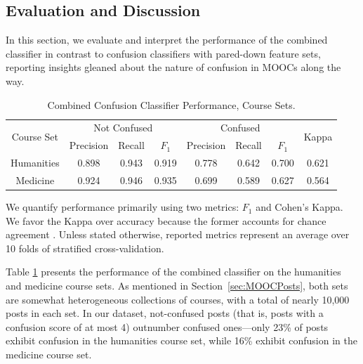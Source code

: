 \documentclass{edm_template}
\begin{document}
\subsection{Evaluation and Discussion}
In this section, we evaluate and interpret the performance of the combined classifier in contrast to confusion classifiers with pared-down feature sets, reporting insights gleaned about the nature of confusion in MOOCs along the way. 

\begin{table}[htp!]
    \centering
    \begin{tabular}{|c|c c c|c c c|c|}
    \hline
    \multirow{2}{*}{Course Set} & \multicolumn{3}{c|}{Not Confused} & \multicolumn{3}{c|}{Confused}  & \multirow{2}{*}{Kappa} \\ \cline{2-7}
                                &  Precision & Recall & $F_{1}$     &  Precision & Recall & $F_{1}$  &       \\ \hline
    Humanities                  & 0.898      & 0.943    & 0.919     & 0.778      & 0.642  & 0.700    & 0.621  \\ \hline
    Medicine                    & 0.924      & 0.946    & 0.935     & 0.699      & 0.589  & 0.627    & 0.564  \\ \hline

    \end{tabular}
    \vspace{-5pt}
    \caption{\textnormal{
       Combined Confusion Classifier Performance, Course Sets.
    }} %
    \label{table:confusion_sets} %
\end{table}

We quantify performance primarily using two metrics: $F_{1}$ and Cohen's Kappa. We favor the Kappa over accuracy because the former accounts for chance agreement \cite{cohen1960coefficient}. Unless stated otherwise, reported metrics represent an average over 10 folds of stratified cross-validation. 

Table \ref{table:confusion_sets} presents the performance of the combined classifier on the humanities and medicine course sets. As mentioned in Section~\ref{sec:MOOCPosts}, both sets are somewhat heterogeneous collections of courses, with a total of nearly 10,000 posts in each set. In our dataset, not-confused posts (that is, posts with a confusion score of at most 4) outnumber confused ones---only 23\% of posts exhibit confusion in the humanities course set, while 16\% exhibit confusion in the medicine course set.
\end{document}
